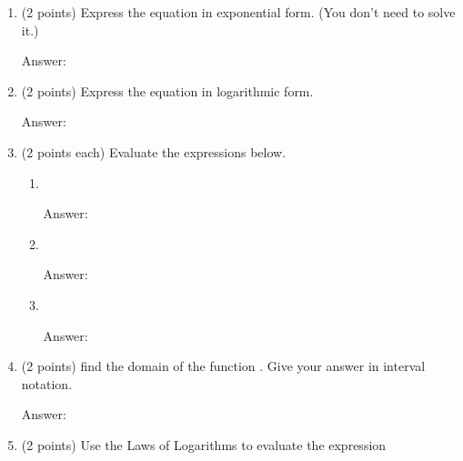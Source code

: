 \documentclass[11pt]{article}
\begin{document}
\begin{enumerate}
\item (2 points) Express the equation \fbox{\scalebox{1.2}{$\log 4=5t $}} in exponential form. (You don't need to solve it.)\\
\begin{flushright}{ Answer:\underline{\hspace{2in}}}\end{flushright}
\vfill
\item (2 points) Express the equation  in logarithmic form.\\
\begin{flushright}{ Answer:\underline{\hspace{2in}}}\end{flushright}
\vfill
\item (2 points each) Evaluate the expressions below.
\begin{enumerate}
\item {}\\
\begin{flushright}{ Answer:\underline{\hspace{2in}}}\end{flushright}
\vfill
\item {}\\
\begin{flushright}{ Answer:\underline{\hspace{2in}}}\end{flushright}
\vfill
\item \scalebox{1.2}{$\log_4 8 $}\\
\begin{flushright}{ Answer:\underline{\hspace{2in}}}\end{flushright}
\vfill
\end{enumerate}
\item (2 points) find the domain of the function \scalebox{1.2}{$h(x)=\ln x + \ln (2-x)$}. Give your answer in interval notation.\\
\begin{flushright}{ Answer:\underline{\hspace{2in}}}\end{flushright}
\vfill
\newpage

\item (2  points) Use the Laws of Logarithms to evaluate the expression\\ 


\end{enumerate}
\end{document}
